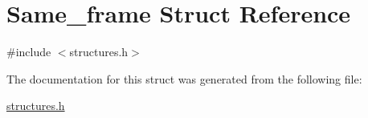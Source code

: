 \hypertarget{structSame__frame}{}\section{Same\+\_\+frame Struct Reference}
\label{structSame__frame}


{\ttfamily \#include $<$structures.\+h$>$}



The documentation for this struct was generated from the following file\+:\begin{DoxyCompactItemize}
\item 
\hyperlink{structures_8h}{structures.\+h}\end{DoxyCompactItemize}
